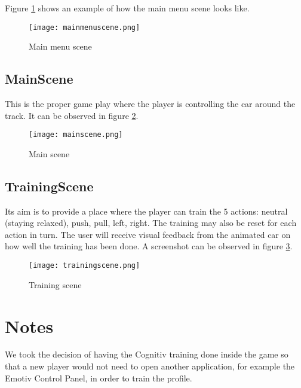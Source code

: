 Figure \ref{fig:mainmenuscene} shows an example of how the main menu scene looks like.

\begin{figure}
  \centering
  \texttt{[image: mainmenuscene.png]}
  \caption{Main menu scene}
    \label{fig:mainmenuscene}           
\end{figure}

\subsection{MainScene}
This is the proper game play where the player is controlling the car around the track. It can be observed in figure \ref{fig:mainscene}.

\begin{figure}
  \centering
  \texttt{[image: mainscene.png]}
  \caption{Main scene}
    \label{fig:mainscene}           
\end{figure}

\subsection{TrainingScene}
Its aim is to provide a place where the player can train the 5 actions: neutral (staying relaxed), push, pull, left, right. The training may also be reset for each action in turn. The user will receive visual feedback from the animated car on how well the training has been done. A screenshot can be observed in figure \ref{fig:trainingscene}.

\begin{figure}
  \centering
  \texttt{[image: trainingscene.png]}
  \caption{Training scene}
    \label{fig:trainingscene}           
\end{figure}

\section{Notes}

We took the decision of having the Cognitiv training done inside the game so that a new player would not need to open another application, for example the Emotiv Control Panel, in order to train the profile.

